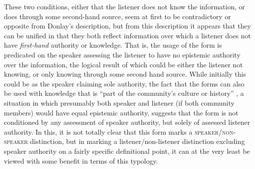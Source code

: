 These two conditions, either that the listener does not know the information, or does through some second-hand source, seem at first to be contradictory or opposite from Donlay's description, but from this description it appears that they can be unified in that they both reflect information over which a listener does not have \textit{first-hand} authority or knowledge. That is, the usage of the form is predicated on the speaker assessing the listener to have no epistemic authority over the information, the logical result of which could be either the listener not knowing, or only knowing through some second hand source. While initially this could be as the speaker claiming sole authority, the fact that the forms can also be used with knowledge that is ``part of the community's culture or history'' \cite[440]{Donlay2019}, a situation in which presumably both speaker and listener (if both community members) would have equal epistemic authority, suggests that the form is not conditioned by any assessment of speaker authority, but solely of assessed listener authority. In this, it is not totally clear that this form marks a \textsc{speaker}/\textsc{non-speaker} distinction, but in marking a listener/non-listener distinction excluding speaker authority on a fairly specific definitional point, it can at the very least be viewed with some benefit in terms of this typology.

